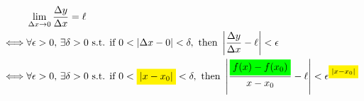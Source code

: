 \documentclass{article}
\newcommand{\abs}[1]{\lvert#1\rvert}
\newcommand{\Abs}[1]{\left\lvert#1\right\rvert}
\newcommand{\highlight}[2][yellow]{%
		\mathchoice%
			{\colorbox{#1}{$\displaystyle#2$}}%
			{\colorbox{#1}{$\textstyle#2$}}%
			{\colorbox{#1}{$\scriptstyle#2$}}%
			{\colorbox{#1}{$\scriptscriptstyle#2$}}%
	}
\begin{document}
\begin{alignat*}{2}
	     & \lim_{\Delta x \to 0} \frac{\Delta y}{\Delta x} = \ell
	\\
	\iff & \forall \epsilon > 0, \,
	       \exists \delta > 0 \text{ s.t. if } 0 < \abs{\Delta x - 0} < \delta,
	       \text{ then } \Abs{\frac{\Delta y}{\Delta x} - \ell} < \epsilon
	\\
	\iff & \forall \epsilon > 0, \,
	       \exists \delta > 0 \text{ s.t. if } 0 < \highlight{\abs{x - x_0}} < \delta,
	       \text{ then } \Abs{\frac{\highlight[green]{f(x) - f(x_0)}}{x-x_0} - \ell} < \epsilon^{\highlight{\abs{x - x_0}}}
\end{alignat*}
\end{document}
